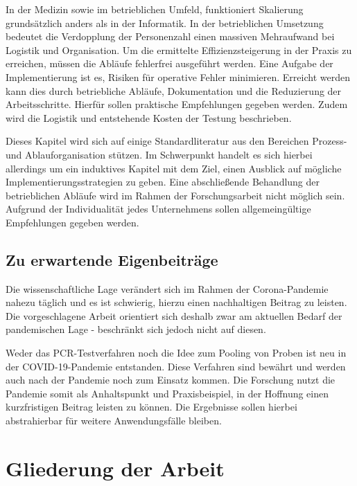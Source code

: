 In der Medizin sowie im betrieblichen Umfeld, funktioniert Skalierung grundsätzlich anders als in der Informatik.
In der betrieblichen Umsetzung bedeutet die Verdopplung der Personenzahl einen massiven Mehraufwand bei Logistik und Organisation.
Um die ermittelte Effizienzsteigerung in der Praxis zu erreichen, müssen die Abläufe fehlerfrei ausgeführt werden.
Eine Aufgabe der Implementierung ist es, Risiken für operative Fehler minimieren.
Erreicht werden kann dies durch betriebliche Abläufe, Dokumentation und die Reduzierung der Arbeitsschritte.
Hierfür sollen praktische Empfehlungen gegeben werden.
Zudem wird die Logistik und entstehende Kosten der Testung beschrieben.

Dieses Kapitel wird sich auf einige Standardliteratur aus den Bereichen Prozess- und Ablauforganisation stützen.
Im Schwerpunkt handelt es sich hierbei allerdings um ein induktives Kapitel mit dem Ziel, einen Ausblick auf mögliche Implementierungsstrategien zu geben.
Eine abschließende Behandlung der betrieblichen Abläufe wird im Rahmen der Forschungsarbeit nicht möglich sein.
Aufgrund der Individualität jedes Unternehmens sollen allgemeingültige Empfehlungen gegeben werden.

\subsection{Zu erwartende Eigenbeiträge}
Die wissenschaftliche Lage verändert sich im Rahmen der Corona-Pandemie nahezu täglich und es ist schwierig, hierzu einen nachhaltigen Beitrag zu leisten.
Die vorgeschlagene Arbeit orientiert sich deshalb zwar am aktuellen Bedarf der pandemischen Lage - beschränkt sich jedoch nicht auf diesen.

Weder das PCR-Testverfahren noch die Idee zum Pooling von Proben ist neu in der COVID-19-Pandemie entstanden.
Diese Verfahren sind bewährt und werden auch nach der Pandemie noch zum Einsatz kommen.
Die Forschung nutzt die Pandemie somit als Anhaltspunkt und Praxisbeispiel, in der Hoffnung einen kurzfristigen Beitrag leisten zu können.
Die Ergebnisse sollen hierbei abstrahierbar für weitere Anwendungsfälle bleiben.

\section{Gliederung der Arbeit}


